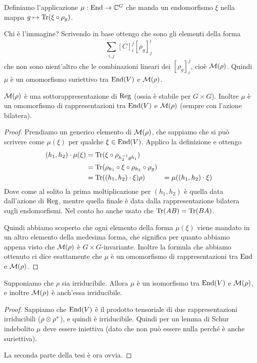 	Definiamo l'applicazione $\mu: \operatorname{End} \rightarrow \mathbb C^{G}$ che manda un endomorfismo $\xi$ nella mappa $g\mapsto \operatorname{Tr}(\xi\circ\rho_g)$.

	Chi è l'immagine? Scrivendo in base ottengo che sono gli elementi della forma
	\[
		\sum_{i,j} [C]_i^j[\rho_g]_j^i
	\]
	che non sono nient'altro che le combinazioni lineari dei $[\rho_g]_i^j$, cioè $\mathcal M(\rho)$. Quindi $\mu$ è un omomorfismo suriettivo tra $\operatorname{End}(V)$ e $\mathcal M(\rho)$.
	
	\begin{myprop}
		$\mathcal M(\rho)$ è una sottorappresentazione di $\operatorname{Reg}$ (ossia è stabile per $G\times G$). Inoltre $\mu$ è un omomorfismo di rappresentazioni tra $\operatorname{End} (V)$ e $\mathcal M(\rho)$ (sempre con l'azione bilatera).		 
	\end{myprop}

	\begin{proof}
		Prendiamo un generico elemento di $\mathcal M(\rho)$, che sappiamo che si può scrivere come $\mu(\xi)$ per qualche $\xi\in\operatorname{End}(V)$. Applico la definizione e ottengo
		\begin{align*}
			(h_1,h_2)\cdot \mu (\xi) &= \operatorname{Tr}(\xi \circ \rho_{h_2^{-1} gh_1})\\
															&= \operatorname{Tr}(\rho_{h_1} \circ \xi \circ \rho_{h_2} \circ \rho_g)\\
															&= \operatorname{Tr}((h_1,h_2)\cdot \xi)\rho)
															&= \mu((h_1,h_2)\cdot \xi)
		\end{align*}
		Dove come al solito la prima moltiplicazione per $(h_1,h_2)$ è quella data dall'azione di $\operatorname{Reg}$, mentre quella finale è data dalla rappresentazione bilatera sugli endomorfismi. Nel conto ho anche usato che $\operatorname{Tr}(AB)=\operatorname{Tr}(BA)$.
		
		Quindi abbiamo scoperto che ogni elemento della forma $\mu(\xi)$ viene mandato in un altro elemento della medesima forma, che significa per quanto abbiamo appena visto che $\mathcal M(\rho)$ è $G\times G$-invariante. Inoltre la formula che abbiamo ottenuto ci dice esattamente che $\mu$ è un omomorfismo di rappresentazioni tra $\operatorname{End}$ e $\mathcal M(\rho)$.
	\end{proof}
	
	\begin{mycor}
		Supponiamo che $\rho$ sia irriducibile. Allora $\mu$ è un isomorfismo tra $\operatorname{End}(V)$ e $\mathcal M(\rho)$, e inoltre $\mathcal M(\rho)$ è anch'essa irriducibile. 
	\end{mycor}
	\begin{proof}
		Sappiamo che $\operatorname{End} (V)$ è il prodotto tensoriale di due rappresentazioni irriducibili ($\rho \otimes \rho^*$), e quindi è irriducibile. Quindi per un lemma di Schur indebolito $\mu$ deve essere iniettiva (dato che non può essere nulla perché è anche suriettiva).
		
		La seconda parte della tesi è ora ovvia.
	\end{proof}
	
